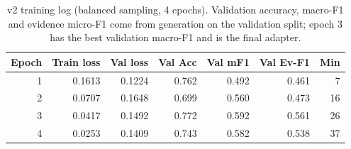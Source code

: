 \begin{table}[t]
\centering
\caption{v2 training log (balanced sampling, 4 epochs). Validation accuracy, macro-F1 and evidence micro-F1 come from generation on the validation split; epoch 3 has the best validation macro-F1 and is the final adapter.}
\label{tab:train}
\footnotesize
\begin{tabular}{rrrrrrr}
\toprule
Epoch & Train loss & Val loss & Val Acc & Val mF1 & Val Ev-F1 & Min \\
\midrule
1 & 0.1613 & 0.1224 & 0.762 & 0.492 & 0.461 & 7 \\
2 & 0.0707 & 0.1648 & 0.699 & 0.560 & 0.473 & 16 \\
3 & 0.0417 & 0.1492 & 0.772 & 0.592 & 0.561 & 26 \\
4 & 0.0253 & 0.1409 & 0.743 & 0.582 & 0.538 & 37 \\
\bottomrule
\end{tabular}
\end{table}
